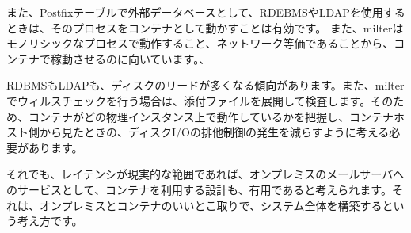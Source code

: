 また、Postfixテーブルで外部データベースとして、RDEBMSやLDAPを使用するときは、そのプロセスをコンテナとして動かすことは有効です。
また、milterはモノリシックなプロセスで動作すること、ネットワーク等価であることから、コンテナで稼動させるのに向いています。、

RDBMSもLDAPも、ディスクのリードが多くなる傾向があります。また、milterでウィルスチェックを行う場合は、添付ファイルを展開して検査します。そのため、コンテナがどの物理インスタンス上で動作しているかを把握し、コンテナホスト側から見たときの、ディスクI/Oの排他制御の発生を減らすように考える必要があります。

それでも、レイテンシが現実的な範囲であれば、オンプレミスのメールサーバへのサービスとして、コンテナを利用する設計も、有用であると考えられます。それは、オンプレミスとコンテナのいいとこ取りで、システム全体を構築するという考え方です。